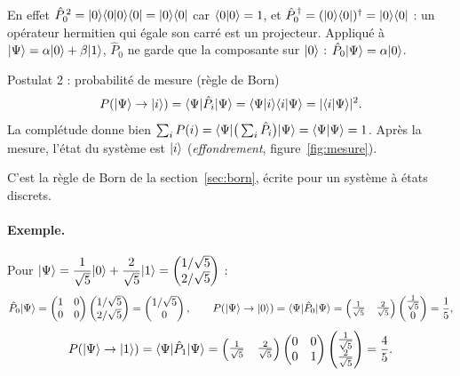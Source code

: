 En effet $\hat P_0^{\,2}=|0\rangle\langle 0|0\rangle\langle 0|=|0\rangle\langle 0|$ car
$\langle 0|0\rangle=1$, et $\hat P_0^{\,\dagger}=(|0\rangle\langle 0|)^\dagger=|0\rangle\langle 0|$ : un opérateur
hermitien qui égale son carré est un projecteur. Appliqué à $|\Psi\rangle=\alpha|0\rangle+\beta|1\rangle$, $\hat P_0$
ne garde que la composante sur $|0\rangle$ : $\hat P_0|\Psi\rangle=\alpha|0\rangle$.

\begin{resultat}{Postulat 2 : probabilité de mesure (règle de Born)}
\[
  P(|\Psi\rangle\to|i\rangle)=\langle \Psi|\hat P_i|\Psi\rangle
  =\langle \Psi|i\rangle\langle i|\Psi\rangle=|\langle i|\Psi\rangle|^2 .
\]
La complétude donne bien $\sum_i P(i)=\langle \Psi|\big(\sum_i\hat P_i\big)|\Psi\rangle=\langle \Psi|\Psi\rangle=1$.
Après la mesure, l'état du système est $|i\rangle$ (\emph{effondrement}, figure~\ref{fig:mesure}).
\end{resultat}

C'est la règle de Born \parencite{born1926} de la section~\ref{sec:born}, écrite pour un système
à états discrets.

\paragraph{Exemple.} Pour $|\Psi\rangle=\dfrac{1}{\sqrt5}|0\rangle+\dfrac{2}{\sqrt5}|1\rangle
=\begin{pmatrix}1/\sqrt5\\ 2/\sqrt5\end{pmatrix}$ :
\[
  \hat P_0|\Psi\rangle=\begin{pmatrix}1 & 0\\ 0 & 0\end{pmatrix}
  \begin{pmatrix}1/\sqrt5\\ 2/\sqrt5\end{pmatrix}
  =\begin{pmatrix}1/\sqrt5\\ 0\end{pmatrix},
  \qquad
  P(|\Psi\rangle\to|0\rangle)=\langle \Psi|\hat P_0|\Psi\rangle
  =\begin{pmatrix}\frac{1}{\sqrt5} & \frac{2}{\sqrt5}\end{pmatrix}
   \begin{pmatrix}\frac{1}{\sqrt5}\\ 0\end{pmatrix}=\frac15 ,
\]
\[
  P(|\Psi\rangle\to|1\rangle)=\langle \Psi|\hat P_1|\Psi\rangle
  =\begin{pmatrix}\frac{1}{\sqrt5} & \frac{2}{\sqrt5}\end{pmatrix}
   \begin{pmatrix}0 & 0\\ 0 & 1\end{pmatrix}
   \begin{pmatrix}\frac{1}{\sqrt5}\\ \frac{2}{\sqrt5}\end{pmatrix}=\frac45 .
\]

